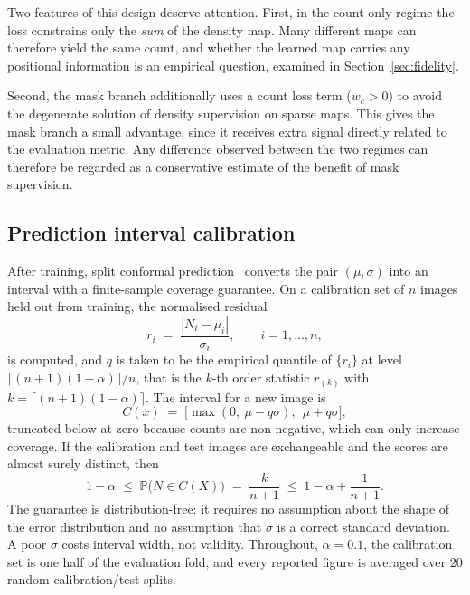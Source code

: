 \documentclass[preprint,12pt]{elsarticle}
\begin{document}
Two features of this design deserve attention. First, in the count-only regime the loss constrains only the
\emph{sum} of the density map. Many different maps can therefore yield the same count, and whether the learned
map carries any positional information is an empirical question, examined in Section~\ref{sec:fidelity}.

Second, the mask branch additionally uses a count loss term ($w_c > 0$) to avoid the degenerate solution of
density supervision on sparse maps. This gives the mask branch a small advantage, since it receives extra
signal directly related to the evaluation metric. Any difference observed between the two regimes can therefore
be regarded as a conservative estimate of the benefit of mask supervision.

\subsection{Prediction interval calibration}\label{sec:conformal}
After training, split conformal prediction~\cite{vovk,cqr} converts the pair $(\mu,\sigma)$ into an interval
with a finite-sample coverage guarantee. On a calibration set of $n$ images held out from training, the
normalised residual
\begin{equation}
r_i \;=\; \frac{|N_i - \mu_i|}{\sigma_i}, \qquad i = 1,\dots,n,
\end{equation}
is computed, and $q$ is taken to be the empirical quantile of $\{r_i\}$ at level
$\lceil (n+1)(1-\alpha)\rceil / n$, that is the $k$-th order statistic $r_{(k)}$ with
$k = \lceil (n+1)(1-\alpha)\rceil$. The interval for a new image is
\begin{equation}
C(x) \;=\; \big[\max(0,\ \mu - q\sigma),\ \ \mu + q\sigma\big],
\end{equation}
truncated below at zero because counts are non-negative, which can only increase coverage. If the calibration
and test images are exchangeable and the scores are almost surely distinct, then~\cite{vovk}
\begin{equation}\label{eq:cov}
1-\alpha \;\le\; \mathbb{P}\big(N \in C(X)\big) \;=\; \frac{k}{n+1} \;\le\; 1-\alpha + \frac{1}{n+1}.
\end{equation}
The guarantee is distribution-free: it requires no assumption about the shape of the error distribution and no
assumption that $\sigma$ is a correct standard deviation. A poor $\sigma$ costs interval width, not validity.
Throughout, $\alpha = 0.1$, the calibration set is one half of the evaluation fold, and every reported figure is
averaged over $20$ random calibration/test splits.
\end{document}

